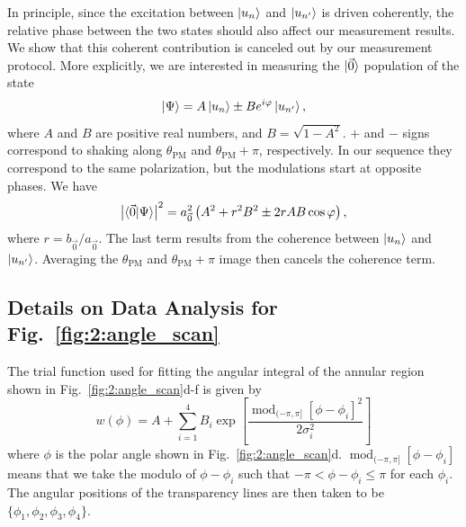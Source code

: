 \documentclass[superscriptaddress, reprint, amsmath, amssymb, aps, prl]{revtex4-2}
\begin{document}
In principle, since the excitation between $\ket{u_n}$ and $\ket{u_{n'}}$ is driven coherently, the relative phase between the two states should also affect our measurement results. We show that this coherent contribution is canceled out by our measurement protocol. More explicitly, we are interested in measuring the $\ket{\vec{0}}$ population of the state
\begin{equation*}
    \ket{\Psi} = A \ket{u_n} \pm B e^{i \varphi} \ket{u_{n'}},
\end{equation*}
where $A$ and $B$ are positive real numbers, and $B = \sqrt{1 - A^2}$. $+$ and $-$ signs correspond to shaking along $\theta_{\mathrm{PM}}$ and $\theta_{\mathrm{PM}} + \pi$, respectively. In our sequence they correspond to the same polarization, but the modulations start at opposite phases. We have 
\begin{equation}
    \left| \braket{\vec{0} | \Psi} \right|^2 = a_{\vec{0}}^2 \left( A^2 + r^2 B^2 \pm 2rAB \cos{\varphi} \right),
\end{equation}
where $r = b_{\vec{0}} / a_{\vec{0}}$. The last term results from the coherence between $\ket{u_n}$ and $\ket{u_{n'}}$. Averaging the $\theta_{\text{PM}}$ and $\theta_{\text{PM}} + \pi$ image then cancels the coherence term.

\subsection{Details on Data Analysis for Fig.~\ref{fig:2:angle_scan}}\label{sec:angle_scan_analysis}
The trial function used for fitting the angular integral of the annular region shown in Fig.~\ref{fig:2:angle_scan}d-f is given by
\begin{equation*}
    w(\phi) = A + \sum_{i = 1}^4 B_i \exp \left[ \frac{\operatorname{mod}_{(-\pi, \pi]}[\phi - \phi_i]^2}{2 \sigma_i^2} \right]
\end{equation*}
where $\phi$ is the polar angle shown in Fig.~\ref{fig:2:angle_scan}d. $\operatorname{mod}_{(-\pi, \pi]}[\phi - \phi_i]$ means that we take the modulo of $\phi - \phi_i$ such that $-\pi < \phi - \phi_i \leq \pi$ for each $\phi_i$.
The angular positions of the transparency lines are then taken to be $\{ \phi_1, \phi_2, \phi_3, \phi_4 \}$.
\end{document}
